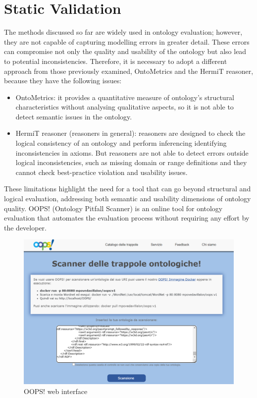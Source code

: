\section{Static Validation}
\label{section:5_3_oops}
The methods discussed so far are widely used in ontology evaluation; however, they are not capable of capturing modelling errors in greater detail. These errors can compromise not only the quality and usability of the ontology but also lead to potential inconsistencies. Therefore, it is necessary to adopt a different approach from those previously examined, OntoMetrics and the HermiT reasoner, because they have the following issues:
\begin{itemize}
    \item OntoMetrics: it provides a quantitative measure of ontology's structural characteristics without analysing qualitative aspects, so it is not able to detect semantic
    issues in the ontology.

    \item HermiT reasoner (reasoners in general): reasoners are designed to check the logical consistency of an ontology and perform inferencing identifying inconsistencies in axioms. But reasoners are not able to detect errors outside logical inconsistencies, such as missing domain or range definitions and they cannot check best-practice violation and usability issues.
\end{itemize}
These limitations highlight the need for a tool that can go beyond structural and logical evaluation, addressing both semantic and usability dimensions of ontology quality.
OOPS! (Ontology Pitfall Scanner) is an online tool for ontology evaluation \cite{poveda2014oops} that automates the evaluation process without requiring any effort by the developer. 
\begin{figure}[H]
    \centering
    \includegraphics[width=0.9\linewidth]{Figures/fig_42.png}
    \caption{OOPS! web interface}
    \label{fig:42}
\end{figure}
